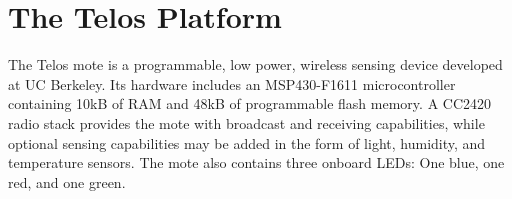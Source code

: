 
\section{The Telos Platform}

The Telos mote\cite{polastre:2005} is a programmable, low power, wireless sensing device developed at UC Berkeley. Its hardware includes an MSP430-F1611 microcontroller containing 10kB of RAM and 48kB of programmable flash memory\cite{msp:2011}. A CC2420 radio stack provides the mote with broadcast and receiving capabilities, while optional sensing capabilities may be added in the form of light, humidity, and temperature sensors. The mote also contains three onboard LEDs: One blue, one red, and one green.